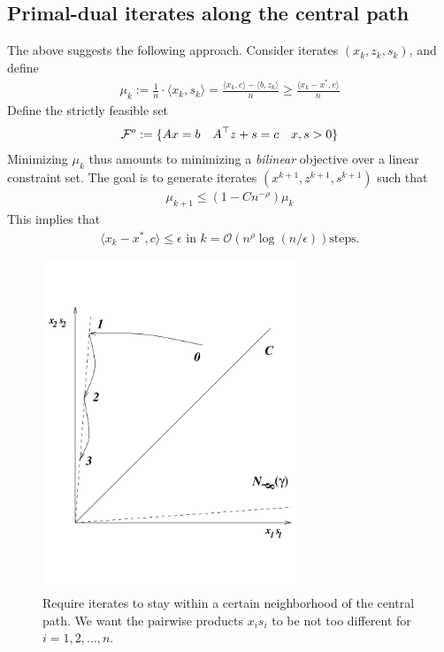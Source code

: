 \subsection{Primal-dual iterates along the central path}
The above suggests the following approach. Consider iterates $(x_k,z_k,s_k)$, and define
\begin{eqnarray*}
\mu_k := \frac{1}{n}\cdot \langle x_k, s_k \rangle = \frac{\langle x_k, c \rangle - \langle b,z_k \rangle}{n} \ge \frac{\langle x_k-x^* , c \rangle}{n}
\end{eqnarray*}
Define the strictly feasible set
\begin{eqnarray*}
{\cal F}^o := \{Ax = b \quad A^{\top} z + s = c \quad x,s  > 0\}
\end{eqnarray*}
Minimizing $\mu_k$ thus amounts to minimizing a \emph{bilinear} objective over a linear constraint set. The goal is to generate iterates $(x^{k+1},z^{k+1},s^{k+1})$ such that 
\begin{eqnarray*}
\mu_{k+1} \le (1 - Cn^{-\rho})\mu_k
\end{eqnarray*}
This implies that 
\begin{eqnarray*}
\langle x_k - x^*, c \rangle \le \epsilon \text{ in } k = \mathcal{O}\left(n^{\rho}\log (n/\epsilon)\right) \text{steps}.
\end{eqnarray*}

\begin{figure}[]
\begin{center}
\includegraphics[width=3in]{figures/lecture26-central_path}
\end{center}
\caption{Require iterates to stay within a certain neighborhood of the central path.
We want the pairwise products $x_i s_i$ to be not too different for $i = 1, 2, . . . , n.$ }
\label{fig:figcentralpath}
\end{figure}

